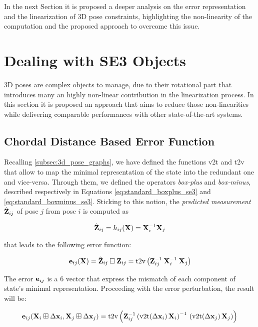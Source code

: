 In the next Section it is proposed a deeper analysis on the error representation and the linearization of 3D pose constraints, highlighting the non-linearity of the computation and the proposed approach to overcome this issue.

\section{Dealing with SE3 Objects}{\label{sec:se3_objects}}
3D poses are complex objects to manage, due to their rotational part that introduces many an highly non-linear contribution in the linearization process. In this section it is proposed an approach that aims to reduce those non-linearities while delivering comparable performances with other state-of-the-art systems.

\subsection{Chordal Distance Based Error Function}\label{subsec:chordal_dist_error}
Recalling \ref{subsec:3d_pose_graphs}, we have defined the functions v2t and t2v that allow to map the minimal representation of the state into the redundant one and vice-versa. Through them, we defined the operators \textit{box-plus} and \textit{box-minus}, described respectively in Equations \ref{eq:standard_boxplus_se3} and \ref{eq:standard_boxminus_se3}. Sticking to this notion, the \textit{predicted measurement} $\hat{\mathbf{Z}}_{ij}$ of pose $j$ from pose $i$ is computed as

\begin{equation}
    \label{eq:standard_prediction_se3}
    \hat{\mathbf{Z}}_{ij} = h_{ij}(\mathbf{X}) = \mathbf{X}_i^{-1}\mathbf{X}_j
\end{equation}

\noindent that leads to the following error function:

\begin{equation}
    \label{eq:standard_error_se3}
    \mathbf{e}_{ij}(\mathbf{X}) = \hat{\mathbf{Z}}_{ij} \boxminus \mathbf{Z}_{ij} = \text{t2v}\left(\mathbf{Z}_{ij}^{-1}\: \mathbf{X}_i^{-1} \: \mathbf{X}_j\right)
\end{equation}

\noindent The error $\mathbf{e}_{ij}$ is a 6 vector that express the mismatch of each component of state's minimal representation. Proceeding with the error perturbation, the result will be:

\begin{equation}
    \label{eq:standard_perturbated_error_se3}
    \error_{ij}(\SState_i \boxplus \dx_i, \SState_j \boxplus \dx_j) = \text{t2v}\left(\Meas_{ij}^{-1}\left(\v2t(\dx_i)\,\SState_i\right)^{-1} \, \left(\v2t(\dx_j)\,\SState_j\right)\right)
\end{equation}

